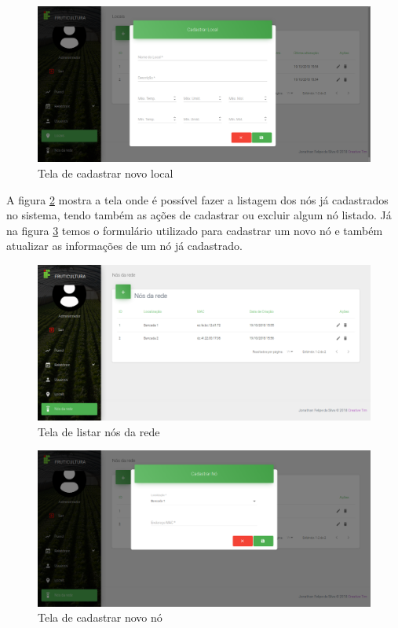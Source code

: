 \begin{figure}[H]
    \centering
    \includegraphics[scale=0.3]{04-figuras/tela_cadastra_local.png}
    \caption{Tela de cadastrar novo local}
    \vspace{-\baselineskip}
    \label{fig:tela-cadastrar-local}
\end{figure}

A figura \ref{fig:tela-listar-nos} mostra a tela onde é possível fazer a listagem dos nós já cadastrados no sistema, tendo também as ações de cadastrar ou excluir algum nó listado. Já na figura \ref{fig:tela-cadastrar-no} temos o formulário utilizado para cadastrar um novo nó e também atualizar as informações de um nó já cadastrado.

\begin{figure}[H]
    \centering
    \includegraphics[scale=0.3]{04-figuras/tela_lista_no.png}
    \caption{Tela de listar nós da rede}
    \vspace{-\baselineskip}
    \label{fig:tela-listar-nos}
\end{figure}

\begin{figure}[H]
    \centering
    \includegraphics[scale=0.3]{04-figuras/tela_cadastra_no.png}
    \caption{Tela de cadastrar novo nó}
    \vspace{-\baselineskip}
    \label{fig:tela-cadastrar-no}
\end{figure}


